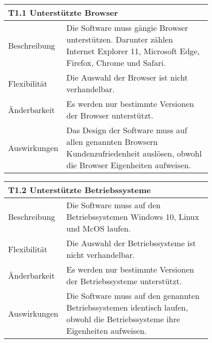 {\centering
\begin{tabular}{|l|p{0.8\linewidth}|}
\hline
\multicolumn{2}{|l|}{\textbf{T1.1 Unterstützte Browser}}
  \tabularnewline \hline
Beschreibung                                               &  Die Software muss gängie Browser unterstützen. Darunter zählen Internet Explorer 11, Microsoft Edge, Firefox, Chrome und Safari.                                                 \tabularnewline \hline
Flexibilität                                              & Die Auswahl der Browser ist nicht verhandelbar.                                                                                \tabularnewline \hline
Änderbarkeit                                         & Es werden nur bestimmte Versionen der Browser unterstützt.                                                        \tabularnewline \hline
Auswirkungen                                                & Das Design der Software muss auf allen genannten Browsern Kundenzufriedenheit auslösen, obwohl die Browser Eigenheiten aufweisen.                              \tabularnewline \hline
 \hline
\end{tabular}

\centering
\begin{tabular}{|l|p{0.8\linewidth}|}
\hline
\multicolumn{2}{|l|}{\textbf{T1.2 Unterstützte Betriebssysteme}}
  \tabularnewline \hline
Beschreibung                                               &  Die Software muss auf den Betriebssystemen Windows 10, Linux und McOS laufen.                                               \tabularnewline \hline
Flexibilität                                              & Die Auswahl der Betriebssysteme ist nicht verhandelbar.                                                                                \tabularnewline \hline
Änderbarkeit                                         & Es werden nur bestimmte Versionen der Betriebssysteme unterstützt.                                                        \tabularnewline \hline
Auswirkungen                                                & Die Software muss auf den genannten Betriebssystemen identisch laufen, obwohl die Betriebssysteme ihre Eigenheiten aufweisen.                                    \tabularnewline \hline
 \hline
\end{tabular}

}
